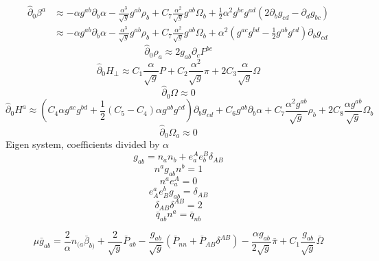 \documentclass{article}
\begin{document}
\begin{align*}
{\hat \partial}_{0}\beta^{a} & \approx - \alpha g^{ab}\partial_{b}\alpha -\frac{\alpha^{3}}{\sqrt{g}}g^{ab} \rho_{b} + C_{7}\frac{\alpha^{2}}{\sqrt{g}}g^{ab}\Omega_{b} + \frac{1}{2}\alpha^{2}g^{bc}g^{ad}\left(2\partial_{b}g_{cd}  - \partial_{d}g_{bc}\right)\\
& \approx - \alpha g^{ab}\partial_{b}\alpha -\frac{\alpha^{3}}{\sqrt{g}}g^{ab} \rho_{b} + C_{7}\frac{\alpha^{2}}{\sqrt{g}}g^{ab}\Omega_{b} + \alpha^{2}\left(g^{ac}g^{bd} - \frac{1}{2}g^{ab}g^{cd}\right)\partial_{b}g_{cd}
\end{align*}
\[
{\hat \partial}_{0}\rho_{a} \approx 2g_{ab}\partial_{c}P^{bc}
\]
\[
{\hat \partial}_{0}H_{\perp} \approx C_{1}\frac{\alpha}{\sqrt{g}}P + C_{2}\frac{\alpha^{2}}{\sqrt{g}}\pi + 2C_{3}\frac{\alpha}{\sqrt{g}}\Omega
\]
\[
{\hat \partial}_{0}\Omega \approx 0
\]
\[
{\hat \partial}_{0}H^{a} \approx \left(C_{4}\alpha g^{ac}g^{bd} + \frac{1}{2}(C_{5}-C_{4})\alpha g^{ab}g^{cd}\right)\partial_{b}g_{cd} + C_{6}g^{ab}\partial_{b}\alpha + C_{7}\frac{\alpha^{2}g^{ab}}{\sqrt{g}}\rho_{b} + 2C_{8}\frac{\alpha g^{ab}}{\sqrt{g}}\Omega_{b}
\]
\[
{\hat \partial}_{0}\Omega_{a} \approx 0
\]
Eigen system, coefficients divided by $\alpha$
\[
g_{ab} = n_{a}n_{b} + e^{A}_{a}e^{B}_{b}\delta_{AB}
\]
\[
n^{a}g_{ab}n^{b} = 1
\]
\[
n^{a}e_{a}^{A} = 0
\]
\[
e^{a}_{A}e^{b}_{B}g_{ab} = \delta_{AB}
\]
\[
\delta_{AB}\delta^{AB} = 2
\]
\[
{\bar q}_{ab}n^{a} = {\bar q}_{nb}
\]

\[
\mu {\bar g}_{ab} = \frac{2}{\alpha}n_{(a}{\bar \beta}_{b)} + \frac{2}{\sqrt{g}}{\bar P}_{ab} - \frac{g_{ab}}{\sqrt{g}}\left({\bar P}_{nn} + {\bar P}_{AB}\delta^{AB}\right) - \frac{\alpha g_{ab}}{2\sqrt{g}}{\bar \pi} + C_{1}\frac{g_{ab}}{\sqrt{g}}{\bar \Omega}
\]
\end{document}
